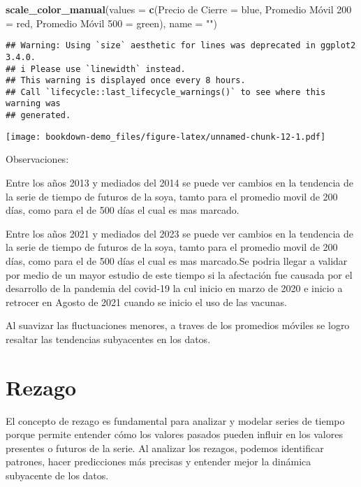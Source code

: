 \documentclass[
]{book}
\newenvironment{Shaded}{\begin{snugshade}}{\end{snugshade}}
\newcommand{\AttributeTok}[1]{\textcolor[rgb]{0.13,0.29,0.53}{#1}}
\newcommand{\FunctionTok}[1]{\textcolor[rgb]{0.13,0.29,0.53}{\textbf{#1}}}
\newcommand{\NormalTok}[1]{#1}
\newcommand{\OtherTok}[1]{\textcolor[rgb]{0.56,0.35,0.01}{#1}}
\newcommand{\StringTok}[1]{\textcolor[rgb]{0.31,0.60,0.02}{#1}}
\begin{document}
\begin{Shaded}
\begin{Highlighting}[]
  \FunctionTok{scale\_color\_manual}\NormalTok{(}\AttributeTok{values =} \FunctionTok{c}\NormalTok{(}\StringTok{\textquotesingle{}Precio de Cierre\textquotesingle{}} \OtherTok{=} \StringTok{\textquotesingle{}blue\textquotesingle{}}\NormalTok{, }\StringTok{\textquotesingle{}Promedio Móvil 200\textquotesingle{}} \OtherTok{=} \StringTok{\textquotesingle{}red\textquotesingle{}}\NormalTok{, }\StringTok{\textquotesingle{}Promedio Móvil 500\textquotesingle{}} \OtherTok{=} \StringTok{\textquotesingle{}green\textquotesingle{}}\NormalTok{),}
                     \AttributeTok{name =} \StringTok{""}\NormalTok{)}
\end{Highlighting}
\end{Shaded}

\begin{verbatim}
## Warning: Using `size` aesthetic for lines was deprecated in ggplot2 3.4.0.
## i Please use `linewidth` instead.
## This warning is displayed once every 8 hours.
## Call `lifecycle::last_lifecycle_warnings()` to see where this warning was
## generated.
\end{verbatim}

\texttt{[image: bookdown-demo\_files/figure-latex/unnamed-chunk-12-1.pdf]}

Observaciones:

Entre los años 2013 y mediados del 2014 se puede ver cambios en la tendencia de la serie de tiempo de futuros de la soya, tamto para el promedio movil de 200 días, como para el de 500 días el cual es mas marcado.

Entre los años 2021 y mediados del 2023 se puede ver cambios en la tendencia de la serie de tiempo de futuros de la soya, tamto para el promedio movil de 200 días, como para el de 500 días el cual es mas marcado.Se podria llegar a validar por medio de un mayor estudio de este tiempo si la afectación fue causada por el desarrollo de la pandemia del covid-19 la cul inicio en marzo de 2020 e inicio a retrocer en Agosto de 2021 cuando se inicio el uso de las vacunas.

Al suavizar las fluctuaciones menores, a traves de los promedios móviles se logro resaltar las tendencias subyacentes en los datos.

\hypertarget{rezago}{%
\chapter{Rezago}\label{rezago}}

El concepto de rezago es fundamental para analizar y modelar series de tiempo porque permite entender cómo los valores pasados pueden influir en los valores presentes o futuros de la serie. Al analizar los rezagos, podemos identificar patrones, hacer predicciones más precisas y entender mejor la dinámica subyacente de los datos.
\end{document}
